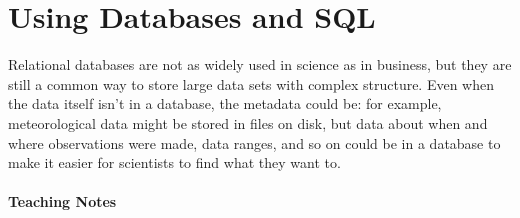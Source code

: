 \documentclass[]{book}
\begin{document}
\section{Using Databases and SQL}

Relational databases are not as widely used in science as in business,
but they are still a common way to store large data sets with complex
structure. Even when the data itself isn't in a database, the metadata
could be: for example, meteorological data might be stored in files on
disk, but data about when and where observations were made, data ranges,
and so on could be in a database to make it easier for scientists to
find what they want to.

\mbox{}\paragraph{Teaching Notes}
\end{document}
